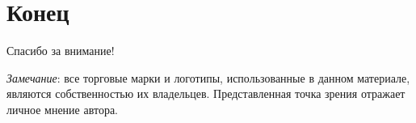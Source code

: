 \documentclass{beamer}
\begin{document}
\section{Конец}
\begin{frame}

{\huge{Спасибо за внимание!}\par}

\vfill

\vfill

\tiny{\textit{Замечание}: все торговые марки и логотипы, использованные в данном материале, являются собственностью их владельцев. Представленная точка зрения отражает личное мнение автора.}

\end{frame}

\end{document}
